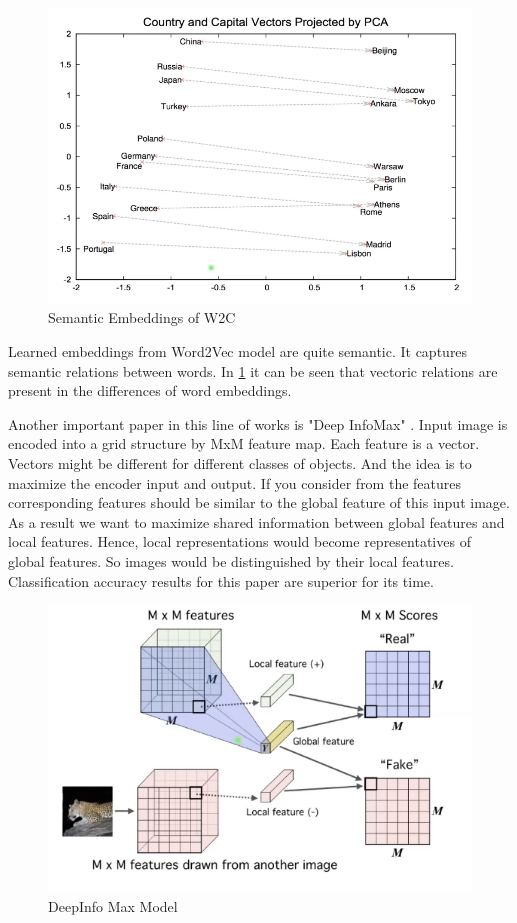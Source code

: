 \documentclass{article}
\begin{document}
 
\begin{figure}[H]
   \centering
   \includegraphics[width=0.8\linewidth]{figures/w2v_semantic.png}
   \caption{Semantic Embeddings of W2C}
   \label{fig:w2c_semantic}
   \end{figure}
 
Learned embeddings from Word2Vec model are quite semantic.
It captures semantic relations between words.
In \ref{fig:w2c_semantic} it can be seen that vectoric relations are present
in the differences of word embeddings.
 
\par
Another important paper in this line of works is "Deep InfoMax" \cite{hjelm2019learning}.
Input image is encoded into a grid structure by MxM feature map.
Each feature is a vector.
Vectors might be different for different classes of objects.
And the idea is to maximize the encoder input and output.
If you consider from the features corresponding features should be
similar to the global feature of this input image.
As a result we want to maximize shared information between global features and
local features.
Hence, local representations would become representatives of global features.
So images would be distinguished by their local features.
Classification accuracy results for this paper are superior for its time.
 
\begin{figure}[H]
   \centering
   \includegraphics[width=0.8\linewidth]{figures/deepinfo_max.png}
   \caption{DeepInfo Max Model}
   \label{fig:deepinfomax_model}
   \end{figure}
 
\end{document}
